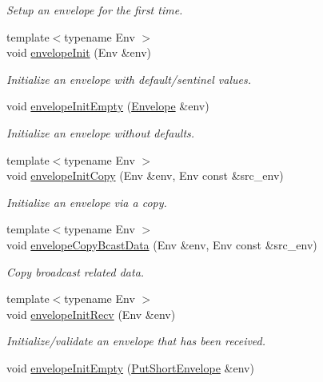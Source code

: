 \begin{DoxyCompactItemize}
\begin{DoxyCompactList}\small\item\em Setup an envelope for the first time. \end{DoxyCompactList}\item 
{\footnotesize template$<$typename Env $>$ }\\void \hyperlink{namespacevt_a26b669aa49c2c9fa4a0fb88902518adb}{envelope\+Init} (Env \&env)
\begin{DoxyCompactList}\small\item\em Initialize an envelope with default/sentinel values. \end{DoxyCompactList}\item 
void \hyperlink{namespacevt_a2594d3d4a1f40c4db73713a8b62b24df}{envelope\+Init\+Empty} (\hyperlink{namespacevt_aa9c8cc094b5361482021d63012987814}{Envelope} \&env)
\begin{DoxyCompactList}\small\item\em Initialize an envelope without defaults. \end{DoxyCompactList}\item 
{\footnotesize template$<$typename Env $>$ }\\void \hyperlink{namespacevt_a931b61a10a85d44d2355e984e40177ff}{envelope\+Init\+Copy} (Env \&env, Env const \&src\+\_\+env)
\begin{DoxyCompactList}\small\item\em Initialize an envelope via a copy. \end{DoxyCompactList}\item 
{\footnotesize template$<$typename Env $>$ }\\void \hyperlink{namespacevt_a16caa74ca477155c59de62474b2e1f89}{envelope\+Copy\+Bcast\+Data} (Env \&env, Env const \&src\+\_\+env)
\begin{DoxyCompactList}\small\item\em Copy broadcast related data. \end{DoxyCompactList}\item 
{\footnotesize template$<$typename Env $>$ }\\void \hyperlink{namespacevt_ace3e4542ae09ecd9728bea6548d71d5a}{envelope\+Init\+Recv} (Env \&env)
\begin{DoxyCompactList}\small\item\em Initialize/validate an envelope that has been received. \end{DoxyCompactList}\item 
void \hyperlink{namespacevt_ab507eac4b5cf7e2712f2c626b379498e}{envelope\+Init\+Empty} (\hyperlink{namespacevt_a8d7a7de9e76bfea1600009a775b7298c}{Put\+Short\+Envelope} \&env)

\end{DoxyCompactItemize}
